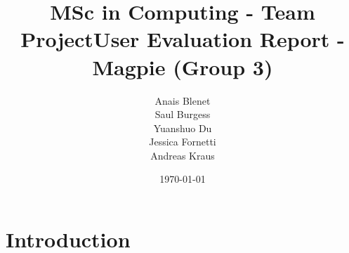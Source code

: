 \documentclass{report}
\begin{document}
\title{MSc in Computing - Team Project}
\title{User Evaluation Report - Magpie (Group 3)}
\author{Anais Blenet\\Saul Burgess\\Yuanshuo Du\\Jessica Fornetti\\Andreas Kraus}
\date{\today}

\renewcommand{\cfttoctitlefont}{\hfill\Huge\bfseries} %
\renewcommand{\cftaftertoctitle}{\hfill}

\maketitle %

\tableofcontents
\newpage

\chapter{Introduction}
\end{document}
